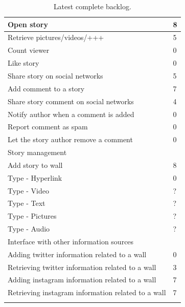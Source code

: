 \documentclass[11pt]{book}
\begin{document}
\begin{center}
\begin{longtable}{| l | l |}
        \hline
        Open story & 8\\
        \hline
        Retrieve pictures/videos/+++ & 5\\
        \hline
        Count viewer & 0\\
        \hline
        Like story & 0\\
        \hline
        Share story on social networks & 5\\
        \hline
        Add comment to a story & 7\\
        \hline
        Share story comment on social networks & 4\\
        \hline
        Notify author when a comment is added     & 0\\
        \hline
        Report comment as spam & 0\\
        \hline
        Let the story author remove a comment     & 0\\
        \hline
        Story management & \\
        \hline
        Add story to wall & 8\\
        \hline
        Type - Hyperlink & 0\\
        \hline
        Type - Video & ?\\
        \hline
        Type - Text & ?\\
        \hline
        Type - Pictures & ?\\
        \hline
        Type - Audio & ?\\
        \hline
        Interface with other information sources & \\
        \hline
        Adding twitter information related to a wall & 0\\
        \hline
        Retrieving twitter information related to a wall    & 3\\
        \hline
        Adding instagram information related to a wall & 7\\
        \hline
        Retrieving instagram information related to a wall & 7\\
        \hline
        \caption{Latest complete backlog.}\label{tab:appendix_backlog}
    \end{longtable}
\end{center}
\end{document}
